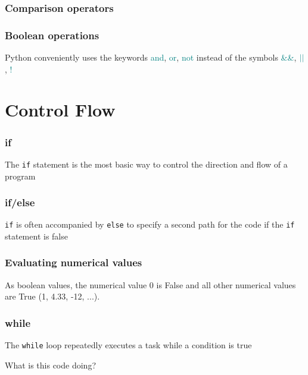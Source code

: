 \documentclass{beamer}
\begin{document}
\begin{frame}
\frametitle{Comparison operators}



\end{frame}

\begin{frame}
\frametitle{Boolean operations}



Python conveniently uses the keywords \textcolor{teal}{and}, \textcolor{teal}{or}, \textcolor{teal}{not} instead of the symbols \textcolor{teal}{\&\&}, $\textcolor{teal}{||}$, \textcolor{teal}{!}

\end{frame}

\section{Control Flow}
\begin{frame}
\frametitle{if}
The \texttt{if} statement is the most basic way to control the direction and flow of a program



\end{frame}


\begin{frame}
\frametitle{if/else}
\texttt{if} is often accompanied by \texttt{else} to specify a second path for the code if the \texttt{if} statement is false



\end{frame}

\begin{frame}
\frametitle{Evaluating numerical values}

As boolean values, the numerical value 0 is False and all other numerical values are True (1, 4.33, -12, ...).



\end{frame}

\begin{frame}
\frametitle{while}
The \texttt{while} loop repeatedly executes a task while a condition is true



What is this code doing?

\end{frame}
\end{document}
